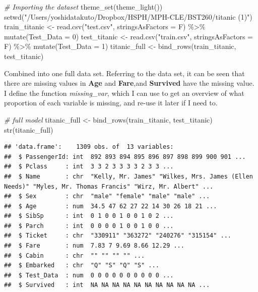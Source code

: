 \documentclass[
]{article}
\newenvironment{Shaded}{\begin{snugshade}}{\end{snugshade}}
\newcommand{\AttributeTok}[1]{\textcolor[rgb]{0.77,0.63,0.00}{#1}}
\newcommand{\CommentTok}[1]{\textcolor[rgb]{0.56,0.35,0.01}{\textit{#1}}}
\newcommand{\DecValTok}[1]{\textcolor[rgb]{0.00,0.00,0.81}{#1}}
\newcommand{\FunctionTok}[1]{\textcolor[rgb]{0.00,0.00,0.00}{#1}}
\newcommand{\NormalTok}[1]{#1}
\newcommand{\OtherTok}[1]{\textcolor[rgb]{0.56,0.35,0.01}{#1}}
\newcommand{\SpecialCharTok}[1]{\textcolor[rgb]{0.00,0.00,0.00}{#1}}
\newcommand{\StringTok}[1]{\textcolor[rgb]{0.31,0.60,0.02}{#1}}
\begin{document}
\begin{Shaded}
\begin{Highlighting}[]
\CommentTok{\# Importing the dataset}
\FunctionTok{theme\_set}\NormalTok{(}\FunctionTok{theme\_light}\NormalTok{())}
\FunctionTok{setwd}\NormalTok{(}\StringTok{"/Users/yoshidatakuto/Dropbox/HSPH/MPH{-}CLE/BST260/titanic (1)"}\NormalTok{)}
\NormalTok{train\_titanic }\OtherTok{\textless{}{-}} \FunctionTok{read.csv}\NormalTok{(}\StringTok{"test.csv"}\NormalTok{, }\AttributeTok{stringsAsFactors =}\NormalTok{ F) }\SpecialCharTok{\%\textgreater{}\%} \FunctionTok{mutate}\NormalTok{(}\AttributeTok{Test\_Data =} \DecValTok{0}\NormalTok{)}
\NormalTok{test\_titanic }\OtherTok{\textless{}{-}} \FunctionTok{read.csv}\NormalTok{(}\StringTok{"train.csv"}\NormalTok{, }\AttributeTok{stringsAsFactors =}\NormalTok{ F) }\SpecialCharTok{\%\textgreater{}\%} \FunctionTok{mutate}\NormalTok{(}\AttributeTok{Test\_Data =} \DecValTok{1}\NormalTok{)}
\NormalTok{titanic\_full }\OtherTok{\textless{}{-}} \FunctionTok{bind\_rows}\NormalTok{(train\_titanic, test\_titanic) }
\end{Highlighting}
\end{Shaded}

Combined into one full data set. Referring to the data set, it can be
seen that there are missing values in \textbf{Age} and \textbf{Fare},and
\textbf{Survived} have the missing value. I define the function
\emph{missing\_var}, which I can use to get an overview of what
proportion of each variable is missing, and re-use it later if I need
to.

\begin{Shaded}
\begin{Highlighting}[]
\CommentTok{\# full model}
\NormalTok{titanic\_full }\OtherTok{\textless{}{-}} \FunctionTok{bind\_rows}\NormalTok{(train\_titanic, test\_titanic)}
\FunctionTok{str}\NormalTok{(titanic\_full)}
\end{Highlighting}
\end{Shaded}

\begin{verbatim}
## 'data.frame':    1309 obs. of  13 variables:
##  $ PassengerId: int  892 893 894 895 896 897 898 899 900 901 ...
##  $ Pclass     : int  3 3 2 3 3 3 3 2 3 3 ...
##  $ Name       : chr  "Kelly, Mr. James" "Wilkes, Mrs. James (Ellen Needs)" "Myles, Mr. Thomas Francis" "Wirz, Mr. Albert" ...
##  $ Sex        : chr  "male" "female" "male" "male" ...
##  $ Age        : num  34.5 47 62 27 22 14 30 26 18 21 ...
##  $ SibSp      : int  0 1 0 0 1 0 0 1 0 2 ...
##  $ Parch      : int  0 0 0 0 1 0 0 1 0 0 ...
##  $ Ticket     : chr  "330911" "363272" "240276" "315154" ...
##  $ Fare       : num  7.83 7 9.69 8.66 12.29 ...
##  $ Cabin      : chr  "" "" "" "" ...
##  $ Embarked   : chr  "Q" "S" "Q" "S" ...
##  $ Test_Data  : num  0 0 0 0 0 0 0 0 0 0 ...
##  $ Survived   : int  NA NA NA NA NA NA NA NA NA NA ...
\end{verbatim}
\end{document}
